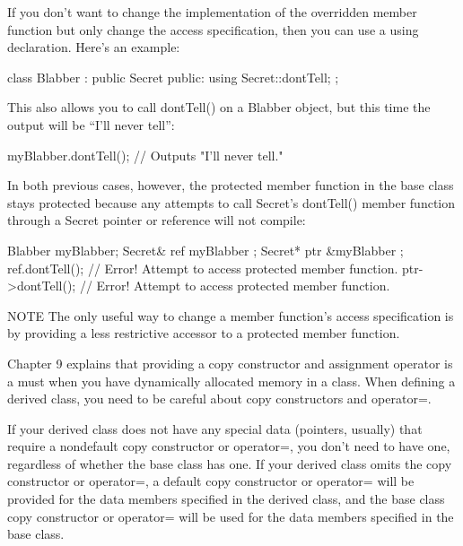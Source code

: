 If you don’t want to change the implementation of the overridden member function but only change the access specification, then you can use a using declaration. Here’s an example:

\begin{cpp}
class Blabber : public Secret
{
    public:
        using Secret::dontTell;
};
\end{cpp}

This also allows you to call dontTell() on a Blabber object, but this time the output will be “I’ll never tell”:

\begin{cpp}
myBlabber.dontTell(); // Outputs "I'll never tell."
\end{cpp}

In both previous cases, however, the protected member function in the base class stays protected because any attempts to call Secret’s dontTell() member function through a Secret pointer or reference will not compile:

\begin{cpp}
Blabber myBlabber;
Secret& ref { myBlabber };
Secret* ptr { &myBlabber };
ref.dontTell(); // Error! Attempt to access protected member function.
ptr->dontTell(); // Error! Attempt to access protected member function.
\end{cpp}

\begin{myNotic}{NOTE}
The only useful way to change a member function’s access specification is by providing a less restrictive accessor to a protected member function.
\end{myNotic}


Chapter 9 explains that providing a copy constructor and assignment operator is a must when you have dynamically allocated memory in a class. When defining a derived class, you need to be careful about copy constructors and operator=.

If your derived class does not have any special data (pointers, usually) that require a nondefault copy constructor or operator=, you don’t need to have one, regardless of whether the base class has one. If your derived class omits the copy constructor or operator=, a default copy constructor or operator= will be provided for the data members specified in the derived class, and the base class copy constructor or operator= will be used for the data members specified in the base class.

